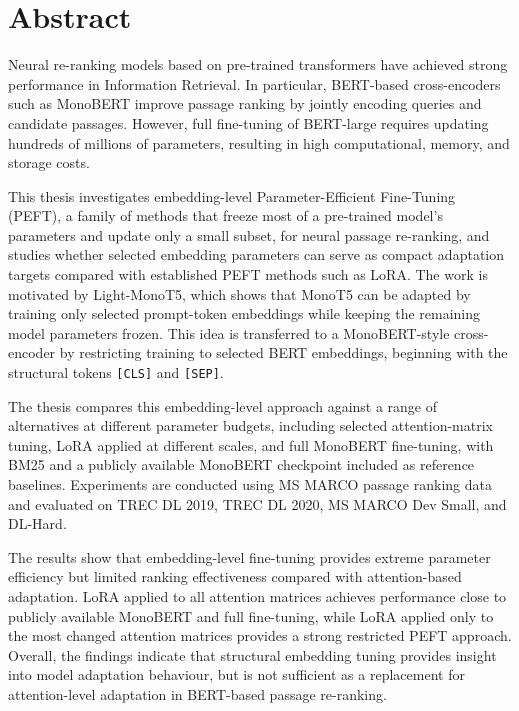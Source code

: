 \chapter*{Abstract}
\begin{sloppypar}

Neural re-ranking models based on pre-trained transformers have achieved strong performance in Information Retrieval. In particular, BERT-based cross-encoders such as MonoBERT improve passage ranking by jointly encoding queries and candidate passages. However, full fine-tuning of BERT-large requires updating hundreds of millions of parameters, resulting in high computational, memory, and storage costs.

This thesis investigates embedding-level Parameter-Efficient Fine-Tuning (PEFT), a family of methods that freeze most of a pre-trained model's parameters and update only a small subset, for neural passage re-ranking, and studies whether selected embedding parameters can serve as compact adaptation targets compared with established PEFT methods such as LoRA. The work is motivated by Light-MonoT5, which shows that MonoT5 can be adapted by training only selected prompt-token embeddings while keeping the remaining model parameters frozen. This idea is transferred to a MonoBERT-style cross-encoder by restricting training to selected BERT embeddings, beginning with the structural tokens \texttt{[CLS]} and \texttt{[SEP]}.

The thesis compares this embedding-level approach against a range of alternatives at different parameter budgets, including selected attention-matrix tuning, LoRA applied at different scales, and full MonoBERT fine-tuning, with BM25 and a publicly available MonoBERT checkpoint included as reference baselines. Experiments are conducted using MS MARCO passage ranking data and evaluated on TREC DL 2019, TREC DL 2020, MS MARCO Dev Small, and DL-Hard.

The results show that embedding-level fine-tuning provides extreme parameter efficiency but limited ranking effectiveness compared with attention-based adaptation. LoRA applied to all attention matrices achieves performance close to publicly available MonoBERT and full fine-tuning, while LoRA applied only to the most changed attention matrices provides a strong restricted PEFT approach. Overall, the findings indicate that structural embedding tuning provides insight into model adaptation behaviour, but is not sufficient as a replacement for attention-level adaptation in BERT-based passage re-ranking.

\end{sloppypar}